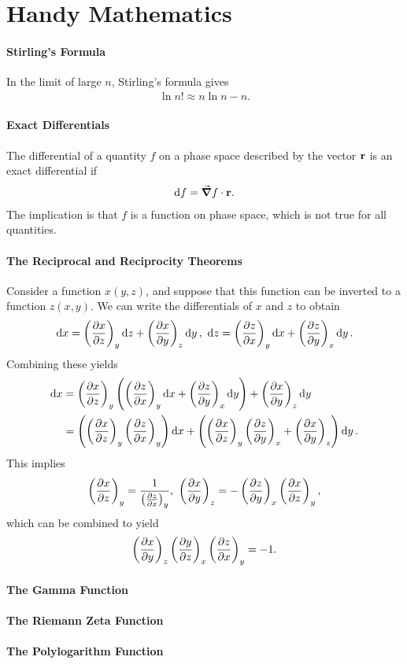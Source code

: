 \section{Handy Mathematics}

\paragraph{Stirling's Formula}
In the limit of large $n$, Stirling's formula gives
\begin{align*}
	\ln{n!}\approx n\ln{n} - n.
\end{align*}

\paragraph{Exact Differentials}
The differential of a quantity $f$ on a phase space described by the vector $\vb{r}$ is an exact differential if
\begin{align*}
	\dd{f} = \grad{f}\cdot\vb{r}.
\end{align*}
The implication is that $f$ is a function on phase space, which is not true for all quantities.

\paragraph{The Reciprocal and Reciprocity Theorems}
Consider a function $x(y, z)$, and suppose that this function can be inverted to a function $z(x, y)$. We can write the differentials of $x$ and $z$ to obtain
\begin{align*}
	\dd{x} = \fix{\pdv{x}{z}}{y}\dd{z} + \fix{\pdv{x}{y}}{z}\dd{y},\ \dd{z} = \fix{\pdv{z}{x}}{y}\dd{x} + \fix{\pdv{z}{y}}{x}\dd{y}.
\end{align*}
Combining these yields
\begin{align*}
	\dd{x} &= \left(\pdv{x}{z}\right)_{y}\left(\left(\pdv{z}{x}\right)_{y}\dd{x} + \left(\pdv{z}{y}\right)_{x}\dd{y}\right) + \left(\pdv{x}{y}\right)_{z}\dd{y} \\
	       &= \left(\left(\pdv{x}{z}\right)_{y}\left(\pdv{z}{x}\right)_{y}\right)\dd{x} + \left(\left(\pdv{x}{z}\right)_{y}\left(\pdv{z}{y}\right)_{x} + \left(\pdv{x}{y}\right)_{z}\right)\dd{y}.
\end{align*}
This implies
\begin{align*}
	\fix{\pdv{x}{z}}{y} = \frac{1}{\fix{\pdv{z}{x}}{y}},\ \fix{\pdv{x}{y}}{z} = -\fix{\pdv{z}{y}}{x}\fix{\pdv{x}{z}}{y},
\end{align*}
which can be combined to yield
\begin{align*}
	 \left(\pdv{x}{y}\right)_{z}\left(\pdv{y}{z}\right)_{x}\left(\pdv{z}{x}\right)_{y} = -1.
\end{align*}

\paragraph{The Gamma Function}

\paragraph{The Riemann Zeta Function}

\paragraph{The Polylogarithm Function}